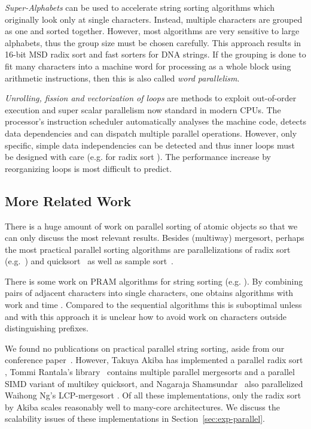 \documentclass[a4paper]{myjournal}
\begin{document}
\emph{Super-Alphabets} can be used to accelerate string sorting algorithms which
originally look only at single characters.  Instead, multiple characters are
grouped as one and sorted together.  However, most algorithms are very sensitive
to large alphabets, thus the group size must be chosen carefully.  This approach
results in 16-bit MSD radix sort and fast sorters for DNA strings.  If the
grouping is done to fit many characters into a machine word for processing as a
whole block using arithmetic instructions, then this is also called \emph{word
  parallelism}.

\emph{Unrolling, fission and vectorization of loops} are methods to exploit
out-of-order execution and super scalar parallelism now standard in modern CPUs.
The processor's instruction scheduler automatically analyses the machine code,
detects data dependencies and can dispatch multiple parallel operations.
However, only specific, simple data independencies can be detected and thus
inner loops must be designed with care (e.g. for radix sort
\cite{karkkainen2009engineering}). The performance increase by reorganizing
loops is most difficult to predict.

\subsection{More Related Work}

There is a huge amount of work on parallel sorting of atomic objects so that we
can only discuss the most relevant results. Besides (multiway) mergesort,
perhaps the most practical parallel sorting algorithms are parallelizations of
radix sort (e.g.~\cite{wassenberg2011engineering}) and
quicksort~\cite{tsigas2003simple} as well as sample
sort~\cite{blelloch1991comparison}.

There is some work on PRAM algorithms for string sorting
(e.g. \cite{hagerup94optimal}). By combining pairs of adjacent characters into
single characters, one obtains algorithms with work  and time
. Compared to the sequential algorithms this is
suboptimal unless  and with this approach it is unclear how to
avoid work on characters outside distinguishing prefixes.

We found no publications on practical parallel string sorting, aside from our
conference paper~\cite{bingmann2013parallel}. However, Ta\-kuya Akiba has
implemented a parallel radix sort \cite{akiba2011radixsort}, Tommi Rantala's
library~\cite{rantala2007web} contains multiple parallel mergesorts and a
parallel SIMD variant of multikey quicksort, and Nagaraja
Shamsundar~\cite{shamsundar2009lcpmergesort} also parallelized Waihong Ng's
LCP-mergesort \cite{ng2008merging}. Of all these implementations, only the radix
sort by Akiba scales reasonably well to many-core architectures.  We discuss the
scalability issues of these implementations in Section~\ref{sec:exp-parallel}.
\end{document}

